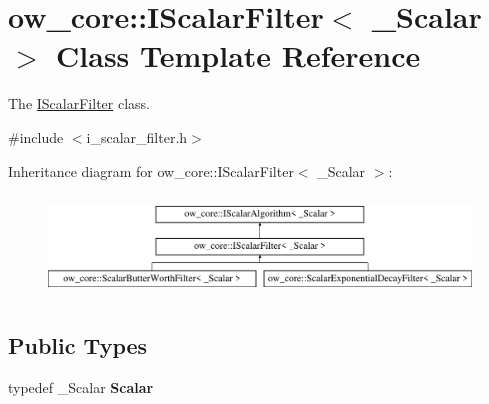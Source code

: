 \hypertarget{classow__core_1_1IScalarFilter}{}\section{ow\+\_\+core\+:\+:I\+Scalar\+Filter$<$ \+\_\+\+Scalar $>$ Class Template Reference}
\label{classow__core_1_1IScalarFilter}


The \hyperlink{classow__core_1_1IScalarFilter}{I\+Scalar\+Filter} class.  




{\ttfamily \#include $<$i\+\_\+scalar\+\_\+filter.\+h$>$}

Inheritance diagram for ow\+\_\+core\+:\+:I\+Scalar\+Filter$<$ \+\_\+\+Scalar $>$\+:\begin{figure}[H]
\begin{center}
\leavevmode
\includegraphics[height=2.700965cm]{d4/d81/classow__core_1_1IScalarFilter}
\end{center}
\end{figure}
\subsection*{Public Types}
\begin{DoxyCompactItemize}
\item 
typedef \+\_\+\+Scalar {\bfseries Scalar}\hypertarget{classow__core_1_1IScalarFilter_ab36ae24a160b9ac5d7afc3bb5c080e2a}{}\label{classow__core_1_1IScalarFilter_ab36ae24a160b9ac5d7afc3bb5c080e2a}

\end{DoxyCompactItemize}
